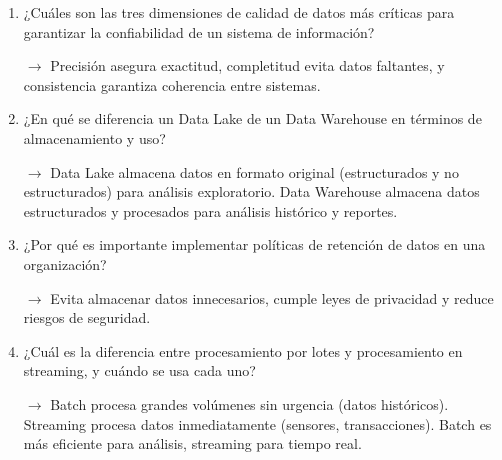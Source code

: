 \documentclass[12pt]{article}
\begin{document}
\begin{enumerate}[label=\arabic*.]
\item ¿Cuáles son las tres dimensiones de calidad de datos más críticas para garantizar la confiabilidad de un sistema de información?

$\rightarrow$ Precisión asegura exactitud, completitud evita datos faltantes, y consistencia garantiza coherencia entre sistemas.

\item ¿En qué se diferencia un Data Lake de un Data Warehouse en términos de almacenamiento y uso?

$\rightarrow$ Data Lake almacena datos en formato original (estructurados y no estructurados) para análisis exploratorio. Data Warehouse almacena datos estructurados y procesados para análisis histórico y reportes.

\item ¿Por qué es importante implementar políticas de retención de datos en una organización?

$\rightarrow$ Evita almacenar datos innecesarios, cumple leyes de privacidad y reduce riesgos de seguridad.

\item ¿Cuál es la diferencia entre procesamiento por lotes y procesamiento en streaming, y cuándo se usa cada uno?

$\rightarrow$ Batch procesa grandes volúmenes sin urgencia (datos históricos). Streaming procesa datos inmediatamente (sensores, transacciones). Batch es más eficiente para análisis, streaming para tiempo real.

\end{enumerate}
\end{document}
